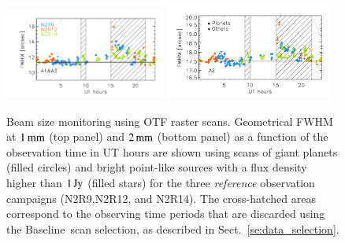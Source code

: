 \documentclass[traditionalabstract]{aa}
\newcommand{\baseline}{Baseline}%
\begin{document}
{\begin{figure}[ht!]
  \begin{center}
    \includegraphics[clip=true, trim={0.9cm, 0.5cm, 0.5cm, 0.5cm}, width=0.4725\textwidth]{Figures/Beam_monitoring_with_otfs_vs_ut_1mm.pdf}
    \includegraphics[clip=true, trim={0.5cm, 0.5cm, 0.5cm, 0.5cm}, width=0.4875\textwidth]{Figures/Beam_monitoring_with_otfs_vs_ut_a2.pdf}
    \caption[Beam size monitoring using OTF scans]{Beam size
      monitoring using OTF raster scans. Geometrical FWHM at $1\,\rm{mm}$ (top panel)
      and $2\,\rm{mm}$ (bottom panel) as a function of the
      observation time in UT hours are shown using scans of giant
      planets (filled circles) and bright point-like sources with a
      flux density higher than $1\,\rm{Jy}$ (filled stars) for the three \emph{reference}
      observation campaigns (N2R9,N2R12, and N2R14). The cross-hatched areas
      correspond to the observing time periods that are discarded using
      the \baseline\ scan selection, as described in Sect.~\ref{se:data_selection}.} 
\label{fig:beam_monitoring_otf}
  \end{center}
\end{figure}

}
\end{document}
